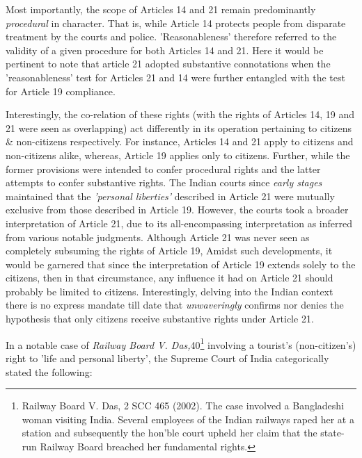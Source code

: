 \begin{multicols}{2}
\vspace{-.1cm}

\noi
Most importantly, the scope of Articles 14 and 21 remain predominantly \textit{procedural} in
character. That is, while Article 14 protects people from disparate treatment by the courts and
police. 'Reasonableness' therefore referred to the validity of a given procedure for both
Articles 14 and 21. Here it would be pertinent to note that article 21 adopted substantive
connotations when the 'reasonableness' test for Articles 21 and 14 were further entangled with
the test for Article 19 compliance.

\vspace{-.2cm}

\noi
Interestingly, the co-relation of these rights (with the rights of Articles 14, 19 and 21 were
seen as overlapping) act differently in its operation pertaining to citizens \& non-citizens
respectively. For instance, Articles 14 and 21 apply to citizens and non-citizens alike, whereas, Article 19 applies only to citizens. Further, while the former provisions were
intended to confer procedural rights and the latter attempts to confer substantive rights.
The Indian courts since \textit{early stages} maintained that the \textit{'personal liberties'} described in
Article 21 were mutually exclusive from those described in Article 19. However, the courts
took a broader interpretation of Article 21, due to its all-encompassing interpretation as
inferred from various notable judgments. Although Article 21 was never seen as completely
subsuming the rights of Article 19, Amidst such developments, it would be garnered that
since the interpretation of Article 19 extends solely to the citizens, then in that circumstance,
any influence it had on Article 21 should probably be limited to citizens. Interestingly,
delving into the Indian context there is no express mandate till date that \textit{unwaveringly}
confirms nor denies the hypothesis that only citizens receive substantive rights under Article
21.

\noi
In a notable case of \textit{Railway Board V. Das,}40\footnote{Railway Board V. Das, 2 SCC 465 (2002). The case involved a Bangladeshi woman visiting India. Several employees of the Indian railways raped her at a station and subsequently the hon’ble court upheld her claim that the state-run Railway Board breached her fundamental rights.} involving a tourist's (non-citizen's) right to 'life and personal liberty', the Supreme Court of India categorically stated the following:


\end{multicols}
